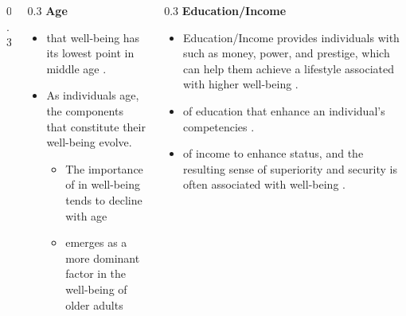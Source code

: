 \documentclass[
	aspectratio=169, %
	t, %
	onlytextwidth, %
	10pt, %
]{beamer}
\begin{document}
\begin{frame}
\begin{columns}[T]
\begin{column}{0.3\linewidth}
\begin{itemize}
			\end{itemize}
		\end{column}
            \pause
		\begin{column}{0.3\linewidth} %
			\textbf{Age}\\
			\begin{itemize}
			    \item {} that well-being has its lowest point in middle age \citep{steptoe_psychological_2015}.
                    \item As individuals age, the components that constitute their well-being evolve.
                    \begin{itemize}
                        \item The importance of  in well-being tends to decline with age \citep{lelkes_happiness_2007}
                        \item {} emerges as a more dominant factor in the well-being of older adults \citep{margolis_family_2013}
                    \end{itemize}
			\end{itemize}
		\end{column}
            \pause
		\begin{column}{0.3\linewidth} %
			\textbf{Education/Income}\\
			\begin{itemize}
			    \item Education/Income provides individuals with  such as money, power, and prestige, which can help them achieve a lifestyle associated with higher well-being \citep{link_social_1995}.
                    \item {} of education that enhance an individual’s competencies \citep{becker_human_1994}.
                    \item {} of income to enhance status, and the resulting sense of superiority and security is often associated with well-being \citep{frey_happiness_2002}.
			\end{itemize}
		\end{column}
	\end{columns}
\end{frame}

\end{document}
